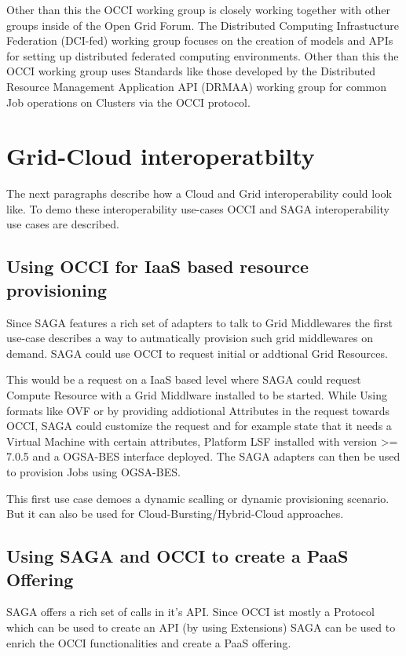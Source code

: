 \documentclass[10pt,conference,final,letterpaper,twoside,twocolumn,]{IEEEtran}
\begin{document}
Other than this the OCCI working group is closely working together
with other groups inside of the Open Grid Forum. The Distributed
Computing Infrastucture Federation (DCI-fed) working group focuses on
the creation of models and APIs for setting up distributed federated
computing environments. Other than this the OCCI working group uses
Standards like those developed by the Distributed Resource Management
Application API (DRMAA) working group for common Job operations on
Clusters via the OCCI protocol.

\section{Grid-Cloud interoperatbilty}
The next paragraphs describe how a Cloud and Grid interoperability
could look like. To demo these interoperability use-cases OCCI and
SAGA interoperability use cases are described.

\subsection{Using OCCI for IaaS based resource provisioning}
Since SAGA features a rich set of adapters to talk to Grid Middlewares
the first use-case describes a way to autmatically provision such grid
middlewares on demand. SAGA could use OCCI to request initial or
addtional Grid Resources.

This would be a request on a IaaS based level where SAGA could request
Compute Resource with a Grid Middlware installed to be started. While
Using formats like OVF or by providing addiotional Attributes in the
request towards OCCI, SAGA could customize the request and for example
state that it needs a Virtual Machine with certain attributes,
Platform LSF installed with version >= 7.0.5 and a OGSA-BES interface
deployed. The SAGA adapters can then be used to provision Jobs using
OGSA-BES.

This first use case demoes a dynamic scalling or dynamic provisioning
scenario. But it can also be used for Cloud-Bursting/Hybrid-Cloud
approaches.

\subsection{Using SAGA and OCCI to create a PaaS Offering}
SAGA offers a rich set of calls in it's API. Since OCCI ist mostly a
Protocol which can be used to create an API (by using Extensions) SAGA
can be used to enrich the OCCI functionalities and create a PaaS
offering.
\end{document}
